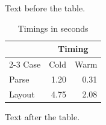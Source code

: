 \documentclass[11pt]{article}
\begin{document}
Text before the table.

\begin{table}[h]\centering\begin{tabular}{lrr}\toprule & \multicolumn{2}{c}{Timing}\\\cmidrule(lr){2-3} Case & Cold & Warm\\\midrule Parse & 1.20 & 0.31\\Layout & 4.75 & 2.08\\\bottomrule\end{tabular}\caption{Timings in seconds}\end{table}

Text after the table.
\end{document}
